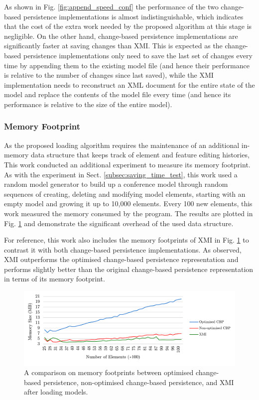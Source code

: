 \documentclass[12pt, a4paper]{report} \usepackage[titletoc]{appendix}
\begin{document}
As shown in Fig. \ref{fig:append_speed_conf} the performance of the two change-based persistence implementations is almost indistinguishable, which indicates that the cost of the extra work needed by the proposed algorithm at this stage is negligible. On the other hand, change-based persistence implementations are significantly faster at saving changes than XMI. This is expected as the change-based persistence implementations only need to save the last set of changes every time by appending them to the existing model file (and hence their performance is relative to the number of changes since last saved), while the XMI implementation needs to reconstruct an XML document for the entire state of the model and replace the contents of the model file every time (and hence its performance is relative to the size of the entire model). 

\subsubsection{Memory Footprint}
\label{subsec:memory_consumption}
As the proposed loading algorithm requires the maintenance of an additional in-memory data structure that keeps track of element and feature editing histories, This work conducted an additional experiment to measure its memory footprint. As with the experiment in Sect. \ref{subsec:saving_time_test}, this work used a random model generator to build up a conference model through random sequences of creating, deleting and modifying model elements, starting with an empty model and growing it up to 10,000 elements. Every 100 new elements, this work measured the memory consumed by the program. The results are plotted in Fig. \ref{fig:memory_ochange-based persistence_change-based persistence_xmi} and demonstrate the significant overhead of the used data structure.

For reference, this work also includes the memory footprints of XMI in Fig. \ref{fig:memory_ochange-based persistence_change-based persistence_xmi} to contrast it with both change-based persistence implementations. As observed, XMI outperforms the optimised change-based persistence representation and performs slightly better than the original change-based persistence representation in terms of its memory footprint. 

\begin{figure}[H]	
	\centering
	\includegraphics[width=\linewidth]{memory_ocbp_cbp_xmi}
	\caption{A comparison on memory footprints between optimised change-based persistence, non-optimised change-based persistence, and XMI after loading models.}\label{fig:memory_ochange-based persistence_change-based persistence_xmi}
\end{figure}
\end{document}
